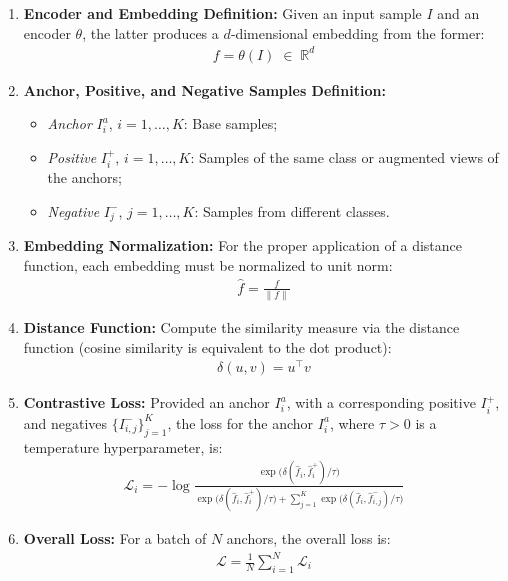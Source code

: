 \begin{enumerate}
  \item \textbf{Encoder and Embedding Definition:}
  Given an input sample \(I\) and an encoder \(\theta\), the latter produces a \(d\)‑dimensional embedding from the former:
  \begin{align}
      f = \theta(I) \;\in\;\mathbb{R}^d 
  \end{align}

  \item \textbf{Anchor, Positive, and Negative Samples Definition:}
    \begin{itemize}
      \item \emph{Anchor} \(I^a_i\), \(i=1,\dots,K\): Base samples;  
      \item \emph{Positive} \(I^+_i\), \(i=1,\dots,K\): Samples of the same class or augmented views of the anchors;
      \item \emph{Negative} \(I^-_j\), \(j=1,\dots,K\): Samples from different classes.
    \end{itemize}

  \item \textbf{Embedding Normalization:}
  For the proper application of a distance function, each embedding must be normalized to unit norm:
  \begin{align}
      \hat{f} = \frac{f}{\lVert f\rVert}
  \end{align}

  \item \textbf{Distance Function:}
  Compute the similarity measure via the distance function (cosine similarity is equivalent to the dot product):
  \begin{align}
      \delta(u, v) = u^\top v
  \end{align}

  \item \textbf{Contrastive Loss:}
    Provided an anchor \(I^a_i\), with a corresponding positive \(I^+_i\), and negatives \(\{I^-_{i,j}\}_{j=1}^K\), the loss for the anchor \(I^a_i\), where \(\tau>0\) is a temperature hyperparameter, is:
    \begin{align}
      \mathcal{L}_i = -\log
      \frac{\exp\bigl(\delta(\hat{f}_i, \hat{f}^+_i)/\tau\bigr)}
           {\exp\bigl(\delta(\hat{f}_i, \hat{f}^+_i)/\tau\bigr)
            + \sum_{j=1}^K \exp\bigl(\delta(\hat{f}_i, \hat{f}^-_{i,j})/\tau\bigr)}
    \end{align}

    \item \textbf{Overall Loss:}
    For a batch of \(N\) anchors, the overall loss is:
    \begin{align}
      \mathcal{L} = \frac{1}{N} \sum_{i=1}^N \mathcal{L}_i
    \end{align}
\end{enumerate}

